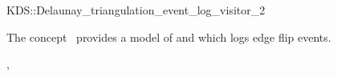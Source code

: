 

\begin{ccRefClass}{KDS::Delaunay_triangulation_event_log_visitor_2}


\ccDefinition
  
The concept \ccRefName\ provides a model of
 and  which logs edge flip events.


\ccIsModel

, 

\ccSeeAlso



\end{ccRefClass}


